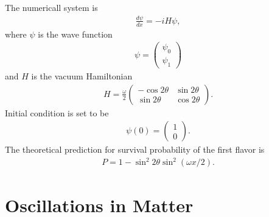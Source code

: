 \documentclass[letterpaper,12pt,english]{sphinxmanual}
\begin{document}
The numericall system is
\begin{equation*}
\begin{split}\frac{d\psi}{dx} = -i H \psi,\end{split}
\end{equation*}
where \(\psi\) is the wave function
\begin{equation*}
\begin{split}\psi = \begin{pmatrix}
\psi_0 \\
\psi_1
\end{pmatrix}\end{split}
\end{equation*}
and \(H\) is the vacuum Hamiltonian
\begin{equation*}
\begin{split}H = \frac{\omega}{2}\begin{pmatrix}
-\cos2\theta &\sin 2\theta \\
\sin 2\theta & \cos 2\theta
\end{pmatrix}.\end{split}
\end{equation*}
Initial condition is set to be
\begin{equation*}
\begin{split}\psi(0) = \begin{pmatrix}
1 \\
0
\end{pmatrix}.\end{split}
\end{equation*}
The theoretical prediction for survival probability of the first flavor is
\begin{equation*}
\begin{split}P  = 1 - \sin^2 2\theta \sin^2 ( \omega x/2 ).\end{split}
\end{equation*}

\section{Oscillations in Matter}
\label{\detokenize{neutrino-oscillations/matter-oscillations::doc}}\label{\detokenize{neutrino-oscillations/matter-oscillations:oscillations-in-matter}}
\end{document}
